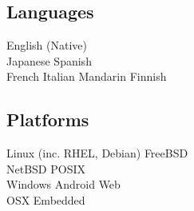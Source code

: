 \documentclass[11pt, a4paper]{cv}
\begin{document}
\begin{minipage}[t]{0.33\textwidth}
\sectionspace %

\subsection{Languages}
English (Native) \\\vspace{4pt}
Japanese \textbullet{} Spanish \\\vspace{4pt}
French \textbullet{} Italian \textbullet{} Mandarin \textbullet{} Finnish

\sectionspace %

\subsection{Platforms}
Linux (inc. RHEL, Debian) \textbullet{} FreeBSD \\
NetBSD \textbullet{} POSIX \\\vspace{4pt}
Windows \textbullet{} Android \textbullet{} Web \\\vspace{4pt}
OSX \textbullet{} Embedded

\end{minipage} %
\hfill
%
%
\end{document}
